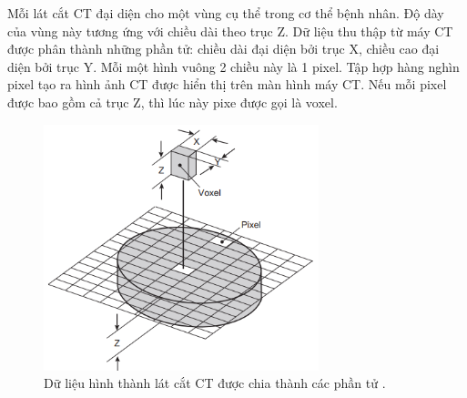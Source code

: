 Mỗi lát cắt CT đại diện cho một vùng cụ thể trong cơ thể bệnh nhân. Độ dày của vùng này tương ứng với chiều dài theo trục Z. Dữ liệu thu thập từ máy CT được phân thành những phần tử: chiều dài đại diện bởi trục X, chiều cao đại diện bởi trục Y. Mỗi một hình vuông 2 chiều này là 1 pixel. Tập hợp hàng nghìn pixel tạo ra hình ảnh CT được hiển thị trên màn hình máy CT. Nếu mỗi pixel được bao gồm cả trục Z, thì lúc này pixe được gọi là voxel.
\begin{figure}[H]
    \centering
    \includegraphics[width=8cm]{images/medicine/img1.png}
    \caption{Dữ liệu hình thành lát cắt CT được chia thành các phần tử \cite{ctimage}.} 
\end{figure}

